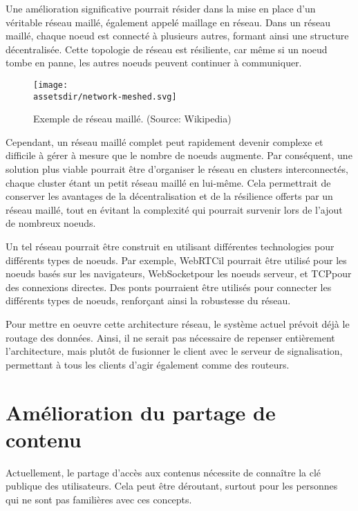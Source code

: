 Une amélioration significative pourrait résider dans la mise en place d'un véritable réseau maillé, également appelé maillage en réseau. Dans un réseau maillé, chaque noeud est connecté à plusieurs autres, formant ainsi une structure décentralisée. Cette topologie de réseau est résiliente, car même si un noeud tombe en panne, les autres noeuds peuvent continuer à communiquer.

\begin{wrapfigure}{l}{0.30\textwidth}
    \centering
    \texttt{[image: \\assetsdir/network-meshed.svg]}
    \caption{Exemple de réseau maillé. (Source: Wikipedia\cite{TopologieMesh2023})}
    \label{fig:network-meshed}
\end{wrapfigure}

Cependant, un réseau maillé complet peut rapidement devenir complexe et difficile à gérer à mesure que le nombre de noeuds augmente. Par conséquent, une solution plus viable pourrait être d'organiser le réseau en clusters interconnectés, chaque cluster étant un petit réseau maillé en lui-même. Cela permettrait de conserver les avantages de la décentralisation et de la résilience offerts par un réseau maillé, tout en évitant la complexité qui pourrait survenir lors de l'ajout de nombreux noeuds.

Un tel réseau pourrait être construit en utilisant différentes technologies pour différents types de noeuds. Par exemple, \Gls{WebRTC}il pourrait être utilisé pour les noeuds basés sur les navigateurs, \Gls{WebSocket}pour les noeuds serveur, et \Gls{TCP}pour des connexions directes. Des ponts pourraient être utilisés pour connecter les différents types de noeuds, renforçant ainsi la robustesse du réseau.

Pour mettre en oeuvre cette architecture réseau, le système actuel prévoit déjà le routage des données. Ainsi, il ne serait pas nécessaire de repenser entièrement l'architecture, mais plutôt de fusionner le client avec le serveur de signalisation, permettant à tous les clients d'agir également comme des routeurs.

\section{Amélioration du partage de contenu}

Actuellement, le partage d'accès aux contenus nécessite de connaître la clé publique des utilisateurs. Cela peut être déroutant, surtout pour les personnes qui ne sont pas familières avec ces concepts.

